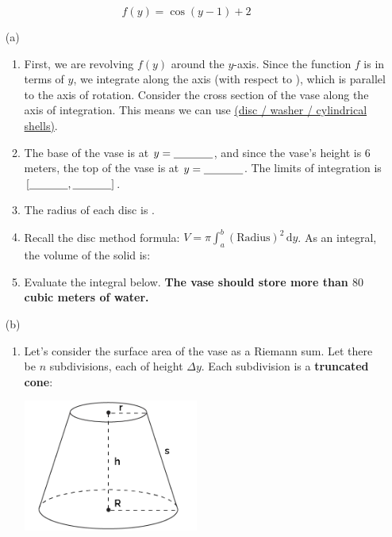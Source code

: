 \documentclass{article}
\begin{document}
\begin{equation*}
	f(y)=\cos(y-1)+2
\end{equation*}
\begin{itemize}[topsep=0pt]
\item[(a)]
	\begin{enumerate}
		\item First, we are revolving $f(y)$ around the $y$-axis. Since the function $f$ is in terms of $y$, we integrate along the \underline{\hspace{0.5in}} axis (with respect to \underline{\hspace{0.5in}}), which is parallel to the axis of rotation. Consider the cross section of the vase along the axis of integration. This means we can use \underline{(disc / washer / cylindrical shells)}.

		\item The base of the vase is at $y=\underline{\hspace{0.5in}}$, and since the vase's height is $6$ meters, the top of the vase is at $y=\underline{\hspace{0.5in}}$. The limits of integration is $[\underline{\hspace{0.5in}}, \underline{\hspace{0.5in}}]$.

		\item The radius of each disc is \underline{\hspace{2in}}.

		\item Recall the disc method formula: $\displaystyle V=\pi \int_{a}^{b}(\text{Radius})^2\,\mathrm{d}y$. As an integral, the volume of the solid is:
			\vspace{1in}

		\item Evaluate the integral below. \textbf{The vase should store more than $80$ cubic meters of water.}
	\end{enumerate}
	\newpage
	
\item[(b)]
	\begin{enumerate}
		\item Let's consider the surface area of the vase as a Riemann sum. Let there be $n$ subdivisions, each of height $\Delta y$. Each subdivision is a \textbf{truncated cone}:
		\begin{center}
			\includegraphics[height=1.7in]{TruncatedCone.png}


\end{center}
\end{enumerate}
\end{itemize}
\end{document}
